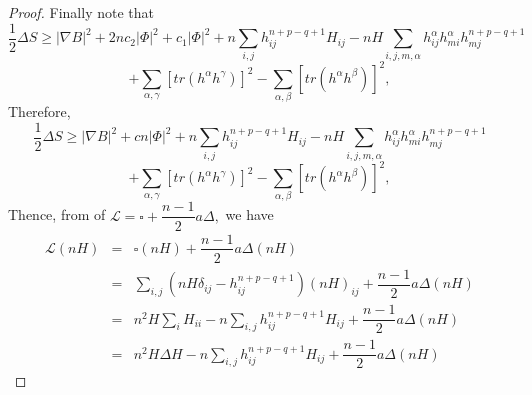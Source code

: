 \documentclass[leqno,11pt]{amsart}
\theoremstyle{plain}
\theoremstyle{definition}
\numberwithin{equation}{section}
\begin{document}
\begin{proof}
Finally note that
$$
\dfrac{1}{2}\Delta S\geq |\nabla B|^2+2nc_2|\Phi|^2+c_1|\Phi|^2+n\sum_{i,j}h_{ij}^{n+p-q+1}H_{ij}-nH\sum_{i,j,m,\alpha}h_{ij}^{\alpha}h_{mi}^{\alpha}h_{mj}^{n+p-q+1}
$$
$$
+\sum_{\alpha,\gamma}[tr(h^{\alpha}h^{\gamma})]^2-\sum_{\alpha,\beta}[tr(h^{\alpha}h^{\beta})]^2,
$$
Therefore,
\begin{equation}\label{deltaS-inequalite}
\dfrac{1}{2}\Delta S\geq |\nabla B|^2+cn|\Phi|^2+n\sum_{i,j}h_{ij}^{n+p-q+1}H_{ij}-nH\sum_{i,j,m,\alpha}h_{ij}^{\alpha}h_{mi}^{\alpha}h_{mj}^{n+p-q+1}
\end{equation}
$$
+\sum_{\alpha,\gamma}[tr(h^{\alpha}h^{\gamma})]^2-\sum_{\alpha,\beta}[tr(h^{\alpha}h^{\beta})]^2,
$$
Thence, from of $\mathcal{L}=\square+\dfrac{n-1}{2}a\Delta,$ we have
\begin{eqnarray*}
\mathcal{L}(nH)&=&\square (nH)+\dfrac{n-1}{2}a\Delta  (nH)\\
&=&\sum_{i,j}(nH\delta_{ij}-h_{ij}^{n+p-q+1})(nH)_{ij}+\dfrac{n-1}{2}a\Delta(nH)\\
&=&n^2H\sum_{i}H_{ii}-n\sum_{i,j}h_{ij}^{n+p-q+1}H_{ij}+\dfrac{n-1}{2}a\Delta (nH)\\
&=&n^2H\Delta H-n\sum_{i,j}h_{ij}^{n+p-q+1}H_{ij}+\dfrac{n-1}{2}a\Delta (nH)
\end{eqnarray*}


\end{proof}
\end{document}

